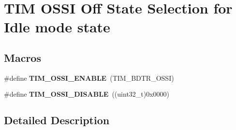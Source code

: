 \hypertarget{group___t_i_m___o_s_s_i___off___state___selection__for___idle__mode__state}{\section{T\-I\-M O\-S\-S\-I Off State Selection for Idle mode state}
\label{group___t_i_m___o_s_s_i___off___state___selection__for___idle__mode__state}
}
\subsection*{Macros}
\begin{DoxyCompactItemize}
\item 
\hypertarget{group___t_i_m___o_s_s_i___off___state___selection__for___idle__mode__state_gae5b5901b177cd054cd5503630892680f}{\#define {\bfseries T\-I\-M\-\_\-\-O\-S\-S\-I\-\_\-\-E\-N\-A\-B\-L\-E}~(T\-I\-M\-\_\-\-B\-D\-T\-R\-\_\-\-O\-S\-S\-I)}\label{group___t_i_m___o_s_s_i___off___state___selection__for___idle__mode__state_gae5b5901b177cd054cd5503630892680f}

\item 
\hypertarget{group___t_i_m___o_s_s_i___off___state___selection__for___idle__mode__state_gab1a20c65a3d24ef770f8a2a14c24130b}{\#define {\bfseries T\-I\-M\-\_\-\-O\-S\-S\-I\-\_\-\-D\-I\-S\-A\-B\-L\-E}~((uint32\-\_\-t)0x0000)}\label{group___t_i_m___o_s_s_i___off___state___selection__for___idle__mode__state_gab1a20c65a3d24ef770f8a2a14c24130b}

\end{DoxyCompactItemize}


\subsection{Detailed Description}
